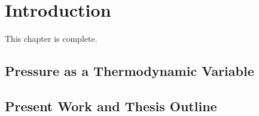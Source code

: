 \setcounter{equation}{0}
\setcounter{figure}{0}
\setcounter{table}{0}

\chapter{\label{chapter1} Introduction}

This chapter is complete.

\section{Pressure as a Thermodynamic Variable}

\section{Present Work and Thesis Outline}

